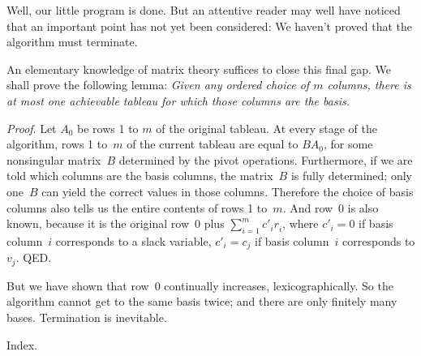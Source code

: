 Well, our little program is done. But an attentive reader may well have
noticed that an important point has not yet been considered: We haven't proved
that the algorithm must terminate.

An elementary knowledge of matrix theory suffices to close this final
gap. We shall prove the following lemma: {\sl Given any ordered choice of
$m$ columns, there is at most one achievable tableau for which those columns
are the basis.}

{\it Proof}.
Let $A_0$ be rows 1 to $m$ of the original tableau. At every stage of
the algorithm, rows 1 to~$m$ of the current tableau are equal to $BA_0$,
for some nonsingular matrix~$B$ determined by the pivot operations.
Furthermore, if we are told which columns are the basis columns, the
matrix~$B$ is fully determined; only one~$B$ can yield the correct
values in those columns. Therefore the choice of basis columns also
tells us the entire contents of rows 1 to~$m$. And row~0 is also known,
because it is the original row~0 plus $\sum_{i=1}^m c'_ir^{\phantom\prime}_i$,
where $c'_i=0$ if basis column~$i$ corresponds to a slack variable,
$c'_i=c_j$ if basis column~$i$ corresponds to $v_j$. QED.

But we have shown that row~0 continually increases, lexicographically.
So the algorithm cannot get to the same basis twice; and there are
only finitely many bases. Termination is inevitable.

\fi

Index.
\fi

\inx
\fin
\con
